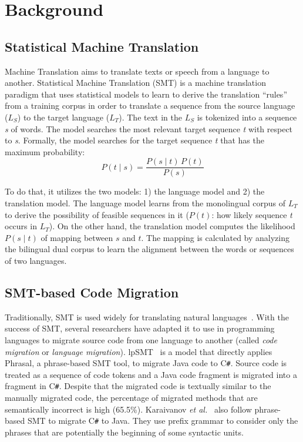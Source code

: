 \section{Background}
\label{sec:background}

\subsection{Statistical Machine Translation}

Machine Translation aims to translate texts or speech from a language to another.
%
Statistical Machine Translation (SMT) is a machine translation
paradigm that uses statistical models to learn to derive the
translation ``rules'' from a training corpus in order to translate a
sequence from the source language ($L_S$) to the target language
($L_T$). The text in the $L_S$ is tokenized into a sequence \textit{s}
of words. The model searches the most relevant target sequence
\textit{t} with respect to \textit{s}. Formally, the model searches
for the target sequence \textit{t} that has the maximum probability:
$$ P\left(t \mid s \right) = \frac{P\left(s \mid t\right) \, P\left(t\right)}{P\left(s\right)} $$

To do that, it utilizes the two models: 1) the language model and 2)
the translation model. The language model learns from the monolingual
corpus of $L_T$ to derive the possibility of feasible sequences in it
($P\left(t\right)$: how likely sequence \textit{t} occurs in
$L_T$). On the other hand, the translation model computes the
likelihood $P\left(s \mid t\right)$ of mapping between $s$ and
$t$. The mapping is calculated by analyzing the bilingual dual
corpus to learn the alignment between the words or sequences of two
languages.

\subsection{SMT-based Code Migration}

Traditionally, SMT is used widely for translating natural
languages~\cite{smtbook}. With the success of SMT, several researchers
have adapted it to use in programming languages to migrate source code
from one language to another (called {\em code migration} or {\em
  language migration}). lpSMT~\cite{fse13-nier} is a model that
directly applies Phrasal, a phrase-based SMT tool, to migrate Java
code to C\texttt{\#}. Source code is treated as a sequence of code
tokens and a Java code fragment is migrated into a fragment in
C\texttt{\#}. Despite that the migrated code is textually similar to
the manually migrated code, the percentage of migrated methods that
are semantically incorrect is high (65.5\%).
%
Karaivanov {\em et al.}~\cite{karaivanov14} also follow phrase-based SMT to
migrate C\texttt{\#} to Java. They use prefix grammar to consider only
the phrases that are potentially the beginning of some syntactic
units.

